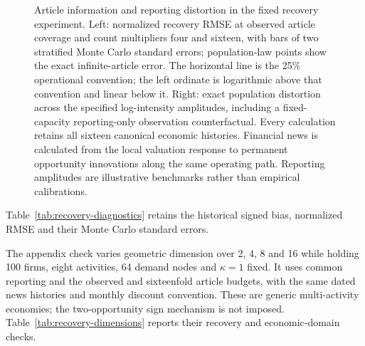 \begin{figure}[tb]
  \centering
  \caption{Article information and reporting distortion in the fixed recovery
    experiment.
    Left: normalized recovery RMSE at observed article coverage and count
    multipliers four and sixteen, with bars of two stratified Monte Carlo
    standard errors; population-law points show the exact
    infinite-article error.
    The horizontal line is the 25\% operational convention; the left ordinate
    is logarithmic above that convention and linear below it.
    Right: exact population distortion across the specified log-intensity
    amplitudes, including a fixed-capacity reporting-only observation
    counterfactual.
    Every calculation retains all sixteen canonical economic histories.
    Financial news is calculated from the local valuation response to permanent
    opportunity innovations along the same operating path.
  Reporting amplitudes are illustrative benchmarks rather than empirical calibrations.}
  \label{fig:information-recovery}
\end{figure}

Table~\ref{tab:recovery-diagnostics} retains the historical signed bias,
normalized RMSE and their Monte Carlo standard errors.



The appendix check varies geometric dimension over 2, 4, 8 and 16 while
holding 100 firms, eight activities, 64 demand nodes and $\kappa=1$ fixed.
It uses common reporting and the observed and sixteenfold article budgets,
with the same dated news histories and monthly discount convention.
These are generic multi-activity economies; the two-opportunity sign
mechanism is not imposed.
Table~\ref{tab:recovery-dimensions} reports their recovery and economic-domain checks.


